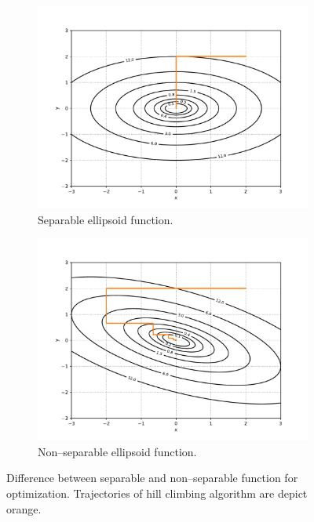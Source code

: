 \begin{figure}
    \begin{subfigure}[t]{0.49\textwidth}
        \includegraphics[width=\textwidth]{img/render_separable.pdf}
        \caption{Separable ellipsoid function.}
        \label{fig:separableelipsoid}
    \end{subfigure}
    \hfill
    \begin{subfigure}[t]{0.49\textwidth}
        \includegraphics[width=\textwidth]{img/render_nonseparable.pdf}
        \caption{Non--separable ellipsoid function.}
        \label{fig:nonseparableelipsoid}
    \end{subfigure}
    \caption{Difference between separable and non--separable function for optimization. Trajectories of hill climbing algorithm are depict orange.}
    \label{fig:separationfucntions}
\end{figure}

